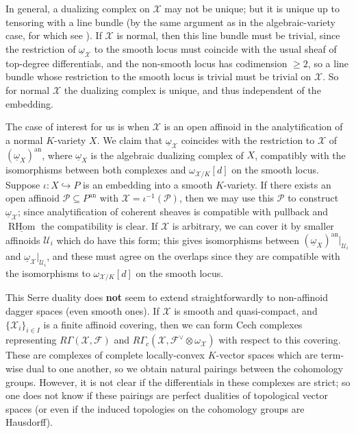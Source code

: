\documentclass[cjm]{ipart}
\theoremstyle{plain}
\theoremstyle{remark}
\newcommand{\cF}{\mathcal{F}}
\newcommand{\cP}{\mathcal{P}}
\newcommand{\cU}{\mathcal{U}}
\newcommand{\cX}{\mathcal{X}}
\newcommand{\into}{\hookrightarrow}
\numberwithin{equation}{subsection}
\renewcommand{\ge}{\geqslant}
\begin{document}
   In general, a dualizing complex on $\cX$ may not be unique; but it is unique up to tensoring with a line bundle (by the same argument as in the algebraic-variety case, for which see \cite[\S V.2]{hartshorne66}). If $\cX$ is normal, then this line bundle must be trivial, since the restriction of $\underline{\omega}_{\cX}$ to the smooth locus must coincide with the usual sheaf of top-degree differentials, and the non-smooth locus has codimension $\ge 2$, so a line bundle whose restriction to the smooth locus is trivial must be trivial on $\cX$. So for normal $\cX$ the dualizing complex is unique, and thus independent of the embedding.

   The case of interest for us is when $\cX$ is an open affinoid in the analytification of a normal $K$-variety $X$. We claim that $\underline{\omega}_{\cX}$ coincides with the restriction to $\cX$ of $(\underline{\omega}_X)^{\mathrm{an}}$, where $\underline{\omega}_X$ is the algebraic dualizing complex of $X$, compatibly with the isomorphisms between both complexes and $\omega_{\cX/K}[d]$ on the smooth locus. Suppose $\iota : X \into P$ is an embedding into a smooth $K$-variety. If there exists an open affinoid $\cP \subseteq P^{\mathrm{an}}$ with $\cX = \iota^{-1}(\cP)$, then we may use this $\cP$ to construct $\underline{\omega}_{\cX}$; since analytification of coherent sheaves is compatible with pullback and $\underline{\operatorname{RHom}}$ the compatibility is clear. If $\cX$ is arbitrary, we can cover it by smaller affinoids $\cU_i$ which do have this form; this gives isomorphisms between $(\underline{\omega}_X)^{\mathrm{an}}|_{\cU_i}$ and $\underline{\omega}_{\cX}|_{\cU_i}$, and these must agree on the overlaps since they are compatible with the isomorphisms to $\omega_{\cX/K}[d]$ on the smooth locus.
%   

   \begin{remark}
    This Serre duality does \textbf{not} seem to extend straightforwardly to non-affinoid dagger spaces (even smooth ones). If $\cX$ is smooth and quasi-compact, and $\{\cX_i\}_{i \in I}$ is a finite affinoid covering, then we can form Cech complexes representing $R\Gamma(\cX, \cF)$ and $R\Gamma_c(\cX, \cF^\vee \otimes \omega_{\cX})$ with respect to this covering. These are complexes of complete locally-convex $K$-vector spaces which are term-wise dual to one another, so we obtain natural pairings between the cohomology groups. However, it is not clear if the differentials in these complexes are strict; so one does not know if these pairings are perfect dualities of topological vector spaces (or even if the induced topologies on the cohomology groups are Hausdorff).
   \end{remark}
\end{document}
